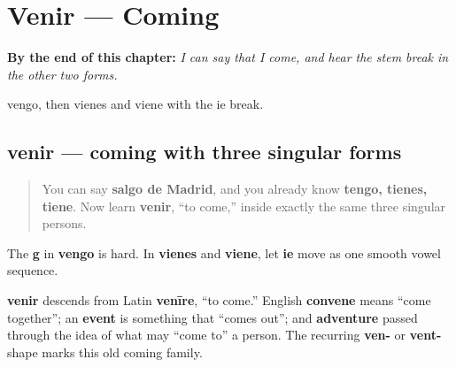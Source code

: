 
\chapter{Venir --- Coming}
\label{ch:spanish-venir}

\begin{chapteropening}
\textbf{By the end of this chapter:} \emph{I can say that I come, and hear the stem break in the other two forms.}

vengo, then vienes and viene with the ie break.
\end{chapteropening}

\section[venir]{venir — coming with three singular forms}

\label{lesson:ES-C13-venir}



\begin{quote}
You can say \textbf{salgo de Madrid}, and you already know \textbf{tengo, tienes, tiene}. Now learn \textbf{venir}, “to come,” inside exactly the same three singular persons.
\end{quote}

\begin{sounds}
The \textbf{g} in \textbf{vengo} is hard. In \textbf{vienes} and \textbf{viene}, let \textbf{ie} move as one smooth vowel sequence.
\end{sounds}

\begin{cousinweb}
\textbf{venir} descends from Latin \textbf{venīre}, “to come.” English \textbf{convene} means “come together”; an \textbf{event} is something that “comes out”; and \textbf{adventure} passed through the idea of what may “come to” a person. The recurring \textbf{ven-} or \textbf{vent-} shape marks this old coming family.
\end{cousinweb}

